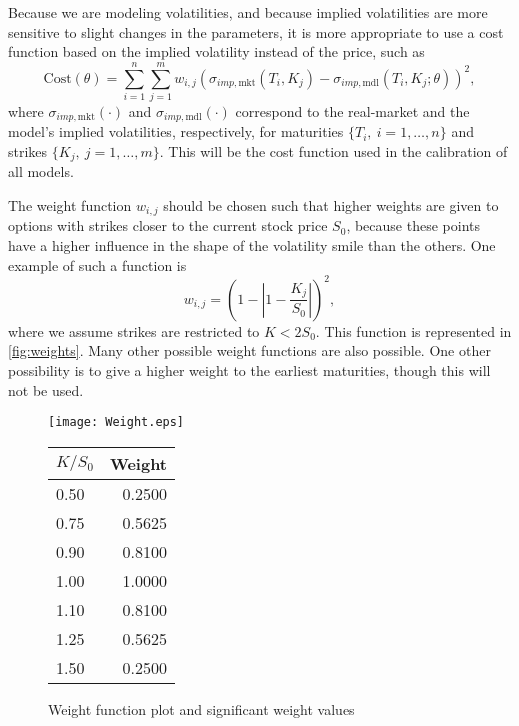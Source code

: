 Because we are modeling volatilities, and because implied volatilities are more sensitive to slight changes in the parameters, it is more appropriate to use a cost function based on the implied volatility instead of the price, such as
\begin{equation}\label{cost}
\boxed{\mathrm{Cost}(\theta)=\sum_{i=1}^n\sum_{j=1}^mw_{i,j}\left(\sigma_{imp,\mathrm{mkt}}(T_i,K_j)-\sigma_{imp,\mathrm{mdl}}(T_i,K_j;\theta)\right)^2,}
\end{equation}
\noindent where $\sigma_{imp,\mathrm{mkt}}(\cdot)$ and $\sigma_{imp,\mathrm{mdl}}(\cdot)$ correspond to the real-market and the model's implied volatilities, respectively, for maturities $\{T_i,\ i=1,\ldots,n\}$ and strikes $\{K_j,\ j=1,\ldots,m\}$. This will be the cost function used in the calibration of all models.



The weight function $w_{i,j}$ should be chosen such that higher weights are given to options with strikes closer to the current stock price $S_0$, because these points have a higher influence in the shape of the volatility smile than the others.
One example of such a function is
\begin{equation}\label{weight}
w_{i,j}=\left(1-\left|1-\frac{K_j}{S_0}\right|\right)^2,
\end{equation}
\noindent where we assume strikes are restricted to $K<2S_0$.
This function is represented in \autoref{fig:weights}. Many other possible weight functions are also possible. One other possibility is to give a higher weight to the earliest maturities, though this will not be used.
    
\begin{figure}[!htb]
  \begin{minipage}[b]{0.65\linewidth}
    \centering
    \texttt{[image: Weight.eps]}
  \end{minipage}%
  \begin{minipage}[b]{0.30\linewidth}
    \centering
    \renewcommand{\arraystretch}{1.1}
\begin{tabular}{@{}lr@{}}
\toprule
$K/S_0$ & Weight \\ \midrule
0.50  & 0.2500 \\
0.75  & 0.5625 \\
0.90  & 0.8100 \\
1.00  & 1.0000 \\
1.10  & 0.8100 \\
1.25  & 0.5625 \\ 
1.50  & 0.2500 \\\bottomrule
\end{tabular}
    \vspace{5em}
  \end{minipage}
\caption[Weight function plot and significant weight values]{Weight function plot and significant weight values}\label{fig:weights}
\end{figure}    
    
